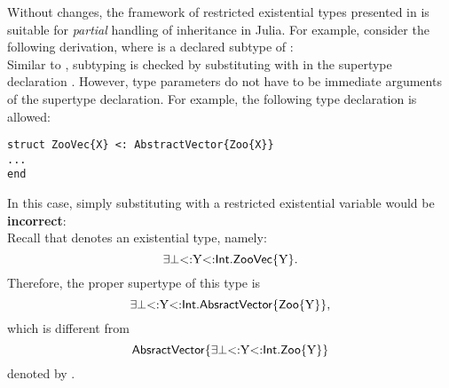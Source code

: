 Without changes, the framework of restricted existential types presented
in  is suitable for \emph{partial} handling of
inheritance in Julia. For example, consider the following derivation,
where \tyinv\nvec\vx is a declared subtype of \tyinv\nabsvec\vx:\\
Similar to , subtyping is checked by substituting
\vx with \rexvarbound{\tybot}{\tyint} in the supertype declaration
\tyinv\nabsvec\vx.
However, type parameters do not have to be immediate arguments of the 
supertype declaration. For example, the following type declaration is
allowed:
\begin{center}
\begin{minipage}{7cm}
\begin{lstlisting}
struct ZooVec{X} <: AbstractVector{Zoo{X}}
...
end
\end{lstlisting}  
\end{minipage}
\end{center}
In this case, simply substituting \vx with a restricted existential variable
would be \textbf{incorrect}:\\
Recall that 
denotes an existential type, namely:
\[
    \exists\bot{\operatorname{<:}}\mathrm{Y}{\operatorname{<:}}\mathsf{Int}.\mathsf{ZooVec}\{\mathrm{Y}\}.
\]
Therefore, the proper supertype of this type is
\[
    \exists\bot{\operatorname{<:}}\mathrm{Y}{\operatorname{<:}}\mathsf{Int}.\mathsf{AbsractVector}\{\mathsf{Zoo}\{\mathrm{Y}\}\},
\]
which is different from 
\[
    \mathsf{AbsractVector}\{\exists\bot{\operatorname{<:}}\mathrm{Y}{\operatorname{<:}}\mathsf{Int}.\mathsf{Zoo}\{\mathrm{Y}\}\}
\]
denoted by \tyinv{}.

